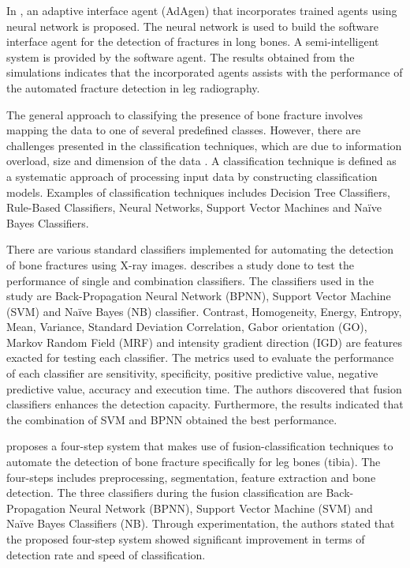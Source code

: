 \documentclass[11pt]{article}
\begin{document}
	In \cite{Syiam_Aziem_Soliman2004}, an adaptive interface agent (AdAgen) that incorporates trained agents using neural network is proposed. The neural network is used to build the software interface agent for the detection of fractures in long bones. A semi-intelligent system is provided by the software agent. The results obtained from the simulations indicates that the incorporated agents assists with the performance of the automated fracture detection in leg radiography.
	
	The general approach to classifying the presence of bone fracture involves mapping the data to one of several predefined classes. However, there are challenges presented in the classification techniques, which are due to information overload, size and dimension of the data \cite{Mahendran2011}. A classification technique is defined as a systematic approach of processing input data by constructing classification models. Examples of classification techniques includes Decision Tree Classifiers, Rule-Based Classifiers, Neural Networks, Support Vector Machines and Na\"{i}ve Bayes Classifiers.
	
	There are various standard classifiers implemented for automating the detection of bone fractures using X-ray images. \cite{Mahendran2012} describes a study done to test the performance of single and combination classifiers. The classifiers used in the study are Back-Propagation Neural Network (BPNN), Support Vector Machine (SVM) and Na\"{i}ve Bayes (NB) classifier. Contrast, Homogeneity, Energy, Entropy, Mean, Variance, Standard Deviation Correlation, Gabor orientation (GO), Markov Random Field (MRF) and intensity gradient direction (IGD) are features exacted for testing each classifier. The metrics used to evaluate the performance of each classifier are sensitivity, specificity, positive predictive value, negative predictive value, accuracy and execution time. The authors discovered that fusion classifiers enhances the detection capacity. Furthermore, the results indicated that the combination of SVM and BPNN obtained the best performance.
	
	\cite{mahendran_Enhanced} proposes a four-step system that makes use of fusion-classification techniques to automate the detection of bone fracture specifically for leg bones (tibia). The four-steps includes preprocessing, segmentation, feature extraction and bone detection. The three classifiers during the fusion classification are Back-Propagation Neural Network (BPNN), Support Vector Machine (SVM) and Na\"{i}ve Bayes Classifiers (NB). Through experimentation, the authors stated that the proposed four-step system showed significant improvement in terms of detection rate and speed of classification.
	
\end{document}
